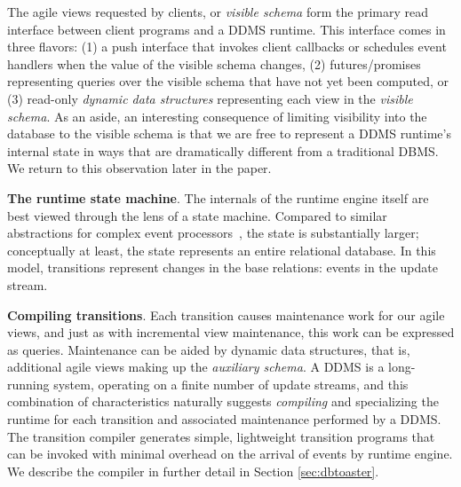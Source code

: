 The agile views requested by clients, or \textit{visible schema} form the
primary read interface between client programs and a DDMS runtime.  This
interface comes in three flavors: (1) a push interface that invokes client
callbacks or schedules event handlers when the value of the visible schema
changes, (2) futures/promises representing queries over the visible schema that
have not yet been computed, or (3) read-only \textit{dynamic data structures}
representing each view in the \textit{visible schema}.  As an aside, an
interesting consequence of limiting visibility into the database to the visible
schema is that we are free to represent a DDMS runtime's internal state in ways
that are dramatically different from a traditional DBMS.  We return to this
observation later in the paper.




{\bf The runtime state machine}\/.
The internals of the runtime engine itself are best viewed through the lens of a
state machine.  Compared to similar abstractions for complex event
processors~\cite{demers-sigmod:07, agrawal-sigmod:08}, the state is
substantially larger; conceptually at least, the state represents an entire
relational database.  In this model, transitions represent changes in the base
relations: events in the update stream.



{\bf Compiling transitions}\/.
Each transition causes maintenance work for our agile views, and just as
with incremental view maintenance, this work can be expressed as queries.
Maintenance can be aided by dynamic data structures, that is, additional agile
views making up the \textit{auxiliary schema}.
A DDMS is a long-running system, operating on a finite number of update streams,
and this combination of characteristics naturally suggests \textit{compiling}
and specializing the runtime for each transition and associated maintenance
performed by a DDMS. The transition compiler generates simple, lightweight
transition programs that can be invoked with minimal overhead on the arrival of
events by runtime engine. We describe the compiler in further detail in Section
\ref{sec:dbtoaster}.







